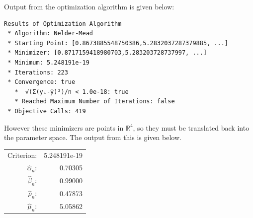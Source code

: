 \documentclass[12pt]{paper}
\newcommand{\setR}{ \mathbb{R} }
\newcommand{\est}[2][n]{ \widehat{ #2 }_{#1}}
\begin{document}
Output from the optimization algorithm is given below:

\begin{verbatim}
Results of Optimization Algorithm
 * Algorithm: Nelder-Mead
 * Starting Point: [0.8673885548750386,5.2832037287379885, ...]
 * Minimizer: [0.8717159418980703,5.283203728737997, ...]
 * Minimum: 5.248191e-19
 * Iterations: 223
 * Convergence: true
   *  √(Σ(yᵢ-ȳ)²)/n < 1.0e-18: true
   * Reached Maximum Number of Iterations: false
 * Objective Calls: 419
\end{verbatim}

However these minimizers are points in $\setR^4$, so they must be
translated back into the parameter space. The output from this is
given below.

\begin{center}
  \begin{tabular}{rr}
    Criterion: & 5.248191e-19\\
\(\est{\alpha}\): & 0.70305\\
\(\est{\beta}\): & 0.99000\\
\(\est{\rho}\): & 0.47873\\
\(\est{\mu}\): & 5.05862\\
\end{tabular}
\end{center}
\end{document}
